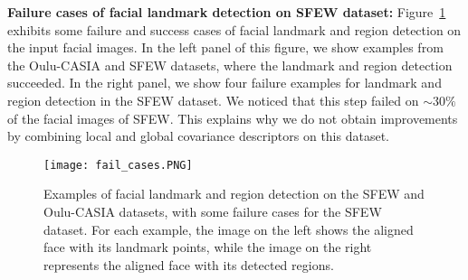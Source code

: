 \documentclass{bmvc2k}
\begin{document}
\textbf{Failure cases of facial landmark detection on SFEW dataset:} 
Figure~\ref{fig:landfail} exhibits some failure and success cases of facial landmark and region detection on the input facial images. In the left panel of this figure, we show examples from the Oulu-CASIA and SFEW datasets, where the landmark and region detection succeeded. In the right panel, we show four failure examples for landmark and region detection in the SFEW dataset. We noticed that this step failed on $\sim30\%$ of the facial images of SFEW. This explains why we do not obtain improvements by combining local and global covariance descriptors on this dataset. 

\begin{figure}[!ht]
\centering
\texttt{[image: fail\_cases.PNG]}
\caption{Examples of facial landmark and region detection on the SFEW and Oulu-CASIA datasets, with some failure cases for the SFEW dataset. For each example, the image on the left shows the aligned face with its landmark points, while the image on the right represents the aligned face with its detected regions.}
\label{fig:landfail}
\end{figure}
\end{document}
